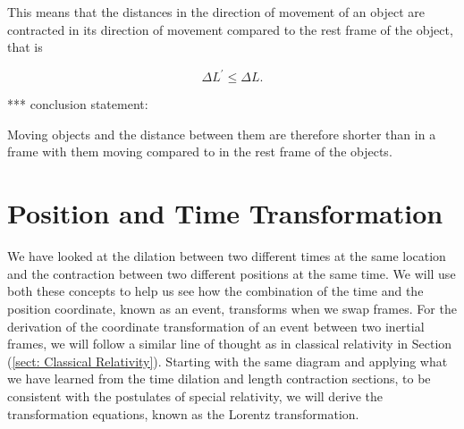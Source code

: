 This means that the distances in the direction of movement of an object are contracted in its direction of movement compared to the rest frame of the object, that is

\begin{equation}
	{\Delta  L^{'}} \leq {\Delta  L}.
\end{equation}

*** conclusion statement:

Moving objects and the distance between them are therefore shorter than in a frame with them moving compared to in the rest frame of the objects.

\section{Position and Time Transformation} \label{sect: Position and Time Transformation}

We have looked at the dilation between two different times at the same location and the contraction between two different positions at the same time.
We will use both these concepts to help us see how the combination of the time and the position coordinate, known as an event, transforms when we swap frames.
For the derivation of the coordinate transformation of an event between two inertial frames, we will follow a similar line of thought as in classical relativity in Section (\ref{sect: Classical Relativity}).
Starting with the same diagram and applying what we have learned from the time dilation and length contraction sections, to be consistent with the postulates of special relativity, we will derive the transformation equations, known as the Lorentz transformation.

